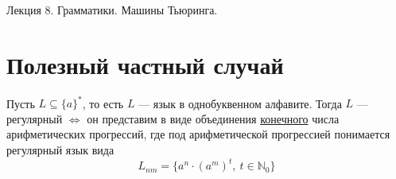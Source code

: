 \documentclass[11pt]{article}
\begin{document}
\begin{titlepage}
    \centering
    \vspace*{\fill}  %

    {\Huge Лекция 8. Грамматики. Машины Тьюринга.
    \par}

    \vspace*{\fill}  %
\end{titlepage}

\setcounter{page}{1}


\section{Полезный частный случай}

\begin{statement}
    Пусть $L \subseteq \{a\}^*$, то есть $L$ --- язык в однобуквенном алфавите. Тогда $L$ --- регулярный $\Longleftrightarrow$ он представим в виде объединения \underline{конечного}
    числа арифметических прогрессий, где под арифметической прогрессией понимается регулярный язык вида \[L_{nm} = \{a^n \cdot (a^m)^t, \ t \in \mathbb{N}_0\}\]
\end{statement}
\end{document}
